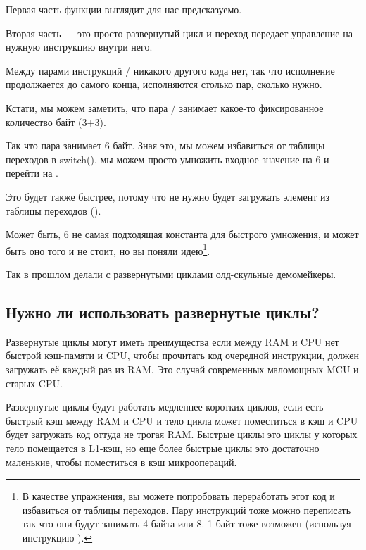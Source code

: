 

Первая часть функции выглядит для нас предсказуемо.

Вторая часть --- это просто развернутый цикл и переход передает управление на нужную инструкцию
внутри него.

Между парами инструкций / никакого другого кода нет, так что исполнение
продолжается до самого конца, исполняются столько пар, сколько нужно.

Кстати, мы можем заметить, что пара / занимает какое-то фиксированное количество
байт (3+3).

Так что пара занимает 6 байт.
Зная это, мы можем избавиться от таблицы переходов в switch(), мы можем просто умножить входное значение
на 6 и перейти на .

Это будет также быстрее, потому что не нужно будет загружать элемент из таблицы переходов ().

Может быть, 6 не самая подходящая константа для быстрого умножения, и может быть оно того и не стоит,
но вы поняли идею\footnote{В качестве упражнения, вы можете попробовать переработать этот код и избавиться
от таблицы переходов.
Пару инструкций тоже можно переписать так что они будут занимать 4 байта или 8.
1 байт тоже возможен (используя инструкцию ).}.

Так в прошлом делали с развернутыми циклами олд-скульные демомейкеры.

\subsection{Нужно ли использовать развернутые циклы?}

Развернутые циклы могут иметь преимущества если между \ac{RAM} и \ac{CPU} нет быстрой кэш-памяти и \ac{CPU},
чтобы прочитать код очередной
инструкции, должен загружать её каждый раз из \ac{RAM}.
Это случай современных маломощных \ac{MCU} и старых \ac{CPU}.

Развернутые циклы будут работать медленнее коротких циклов, если есть быстрый кэш между \ac{RAM} и \ac{CPU} и тело цикла
может поместиться в кэш и CPU будет загружать код оттуда не трогая \ac{RAM}.
Быстрые циклы это циклы у которых тело помещается в L1-кэш, но еще более быстрые циклы это достаточно маленькие,
чтобы поместиться в кэш микроопераций.

